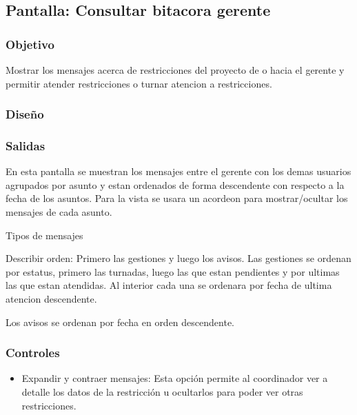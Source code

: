 \subsection{Pantalla: Consultar bitacora gerente}

\subsubsection{Objetivo}
  Mostrar los mensajes acerca de restricciones del proyecto de o hacia el gerente y permitir atender restricciones o turnar atencion a restricciones.

\subsubsection{Diseño}

\subsubsection{Salidas}
  En esta pantalla se muestran los mensajes entre el gerente con los demas usuarios agrupados por asunto y estan ordenados de forma descendente con respecto a la fecha de los asuntos.
  Para la vista se usara un acordeon para mostrar/ocultar los mensajes de cada asunto.

  Tipos de mensajes
  
  Describir orden: Primero las gestiones y luego los avisos. Las gestiones se ordenan por estatus, primero las turnadas, luego las que estan pendientes y por ultimas las que estan atendidas. Al interior cada una se ordenara por fecha de ultima atencion descendente.

  Los avisos se ordenan por fecha en orden descendente.

\subsubsection{Controles}
\begin{itemize}
 \item Expandir y contraer mensajes: Esta opción permite al coordinador ver a detalle los datos de la restricción u ocultarlos para poder ver otras restricciones.
\end{itemize}

